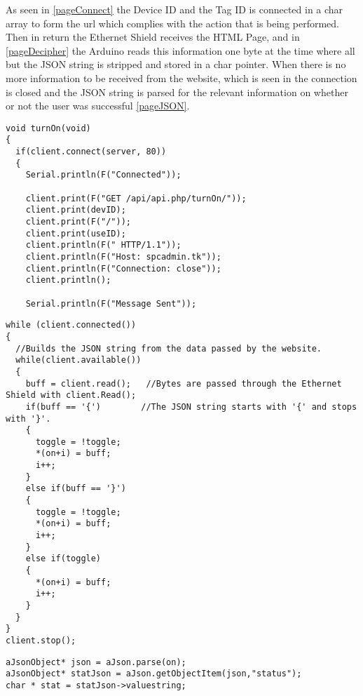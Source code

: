 As seen in \autoref{pageConnect} the Device ID and the Tag ID is connected in a char array to form the url which complies with the action that is being performed. 
Then in return the Ethernet Shield receives the HTML Page, and in \autoref{pageDecipher} the Arduino reads this information one byte at the time where all but the JSON string is stripped and stored in a char pointer.
 When there is no more information to be received from the website, which is seen in  the connection is closed and the JSON string is parsed for the relevant information on whether or not the user was successful \autoref{pageJSON}.
\begin{lstlisting}[frame=single, label=pageConnect, caption=Connecting to the Server and creating an HTML request.]
void turnOn(void)
{
  if(client.connect(server, 80))
  {
    Serial.println(F("Connected")); 

    client.print(F("GET /api/api.php/turnOn/"));
    client.print(devID);
    client.print(F("/"));
    client.print(useID);
    client.println(F(" HTTP/1.1"));
    client.println(F("Host: spcadmin.tk"));
    client.println(F("Connection: close"));
    client.println();
    
    Serial.println(F("Message Sent"));
\end{lstlisting}

\begin{lstlisting}[frame=single, label=pageDecipher, caption=Removing all but the important information from the website.]
while (client.connected())
{
  //Builds the JSON string from the data passed by the website.
  while(client.available()) 
  { 
    buff = client.read();   //Bytes are passed through the Ethernet Shield with client.Read();
    if(buff == '{')        //The JSON string starts with '{' and stops with '}'.
    {
      toggle = !toggle;
      *(on+i) = buff;
      i++;
    }
    else if(buff == '}')
    {
      toggle = !toggle;
      *(on+i) = buff;
      i++;
    }
    else if(toggle)
    {
      *(on+i) = buff;
      i++;
    }
  }
}
client.stop();
\end{lstlisting}

\begin{lstlisting}[frame=single, label=pageJSON, caption=The JSON Code Getting a value with a Token.]
aJsonObject* json = aJson.parse(on);
aJsonObject* statJson = aJson.getObjectItem(json,"status");
char * stat = statJson->valuestring;
\end{lstlisting}